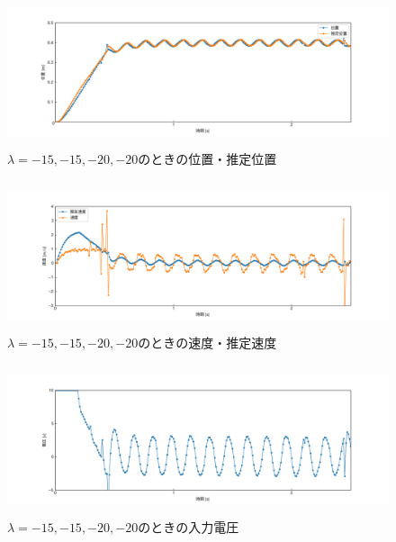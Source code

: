 \documentclass[12pt]{jsarticle}
\begin{document}
\begin{figure}[H]
  \begin{center}
    \includegraphics[clip,width=13.0cm, height=4.4cm]{../img/Exp13-1.png}
    \caption{$\lambda=-15, -15, -20, -20$のときの位置・推定位置}
    \label{Exp13-1}
  \end{center}
\end{figure}
\begin{figure}[H]
  \begin{center}
    \includegraphics[clip,width=13.0cm, height=4.4cm]{../img/Exp13-2.png}
    \caption{$\lambda=-15, -15, -20, -20$のときの速度・推定速度}
    \label{Exp13-2}
  \end{center}
\end{figure}
\begin{figure}[H]
  \begin{center}
    \includegraphics[clip,width=13.0cm, height=4.4cm]{../img/Exp13-3.png}
    \caption{$\lambda=-15, -15, -20, -20$のときの入力電圧}
    \label{Exp13-3}
  \end{center}
\end{figure}
\end{document}
